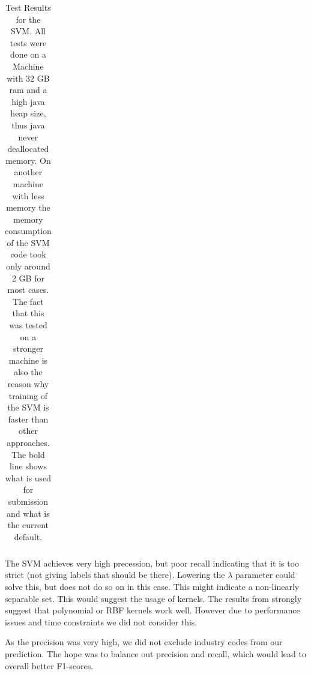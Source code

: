 \documentclass{article}
\begin{document}
\begin{table}[h]
{\begin{tabular}{|l|l|l|l|r|r|r|r|r|r|}
	\end{tabular}
}
\caption{Test Results for the SVM. All tests were done on a Machine with 32 GB ram and a high java heap size, thus java never deallocated memory. On another machine with less memory the memory consumption of the SVM code took only around 2 GB for most cases. The fact that this was tested on a stronger machine is also the reason why training of the SVM is faster than other approaches. The bold line shows what is used for submission and what is the current default.}
\label{table:svmResults}
\end{table}

The SVM achieves very high precession, but poor recall indicating that it is too strict (not giving labels that should be there). Lowering the $\lambda$ parameter could solve this, but does not do so on in this case. This might indicate a non-linearly separable set. This would suggest the usage of kernels. The results from \cite{joachims_text_1998} strongly suggest that polynomial or RBF kernels work well. However due to performance issues and time constraints we did not consider this.

As the precision was very high, we did not exclude industry codes from our prediction. The hope was to balance out precision and recall, which would lead to overall better F1-scores.

\printbibliography
\end{document}
